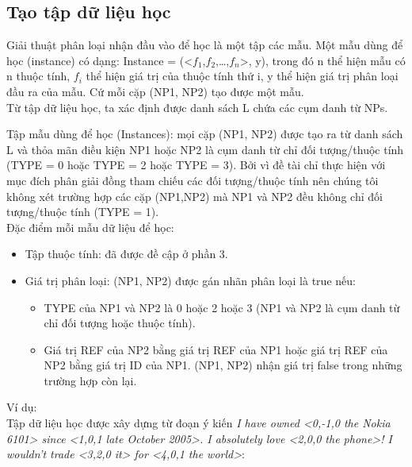\documentclass[12pt]{report}
\begin{document}
			\subsection*{Tạo tập dữ liệu học}
				\par Giải thuật phân loại nhận đầu vào để học là một tập các mẫu. Một mẫu dùng để học (instance) có dạng: Instance = (<$f_1$,$f_2$,…,$f_n$>, y), trong đó n thể hiện mẫu có n thuộc tính, $f_i$ thể hiện giá trị của thuộc tính thứ i, y thể hiện giá trị phân loại đầu ra của mẫu. Cứ mỗi cặp (NP1, NP2) tạo được một mẫu. 
				\\Từ tập dữ liệu học, ta xác định được danh sách L chứa các cụm danh từ NPs.
				\par Tập mẫu dùng để học (Instances): mọi cặp (NP1, NP2) được tạo ra từ danh sách L và thỏa mãn điều kiện NP1 hoặc NP2 là cụm danh từ chỉ đối tượng/thuộc tính (TYPE = 0 hoặc TYPE = 2 hoặc TYPE = 3). Bởi vì đề tài chỉ thực hiện với mục đích phân giải đồng tham chiếu các đối tượng/thuộc tính nên chúng tôi không xét trường hợp các cặp (NP1,NP2) mà NP1 và NP2 đều không chỉ đối tượng/thuộc tính (TYPE = 1).
				\\Đặc điểm mỗi mẫu dữ liệu để học:
				\begin{itemize}
					\item{Tập thuộc tính: đã được đề cập ở phần 3.}
					\item{Giá trị phân loại: (NP1, NP2) được gán nhãn phân loại là true nếu:
						\begin{itemize}
							\item{TYPE của NP1 và NP2 là 0 hoặc 2 hoặc 3 (NP1 và NP2 là cụm danh từ chỉ đối tượng hoặc thuộc tính).}
							\item{Giá trị REF của NP2 bằng giá trị REF của NP1 hoặc giá trị REF của NP2 bằng giá trị ID của NP1. (NP1, NP2) nhận giá trị false trong những trường hợp còn lại.}
						\end{itemize}}
				\end{itemize}
				\par Ví dụ: 
				\\Tập dữ liệu học được xây dựng từ đoạn ý kiến \textit{I have owned <0,-1,0 the Nokia 6101> since <1,0,1 late October 2005>. I absolutely love <2,0,0 the phone>! I wouldn't trade <3,2,0 it> for <4,0,1 the world>}:							
\end{document}
